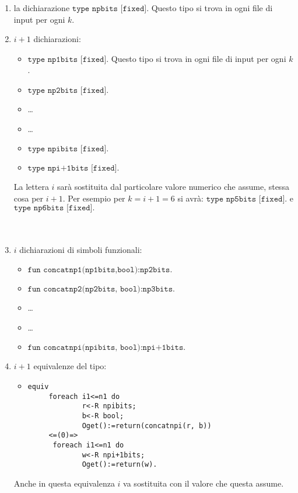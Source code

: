 \documentclass[a4paper,openright,twoside,12pt]{report}
\begin{document}
\begin{enumerate}
 \item la dichiarazione $\texttt{type npbits [fixed].}$ Questo tipo si trova in ogni file di input per ogni $k$.
 \item $i+1$ dichiarazioni: \begin{itemize}
                                       \item $\texttt{type np1bits [fixed].}$ Questo tipo si trova in ogni file di input per ogni $k$.
                                       \item $\texttt{type np2bits [fixed].}$
				       \item \dots
				       \item \dots
				       \item $\texttt{type npibits [fixed].}$
				       \item $\texttt{type npi+1bits [fixed].}$	
	                               \end{itemize}
La lettera $i$ sar\`a sostituita dal particolare valore numerico che assume, stessa cosa per $i+1$.
Per esempio per $k=i+1=6$ si avr\`a: $\texttt{type np5bits [fixed].}$ e $\texttt{type np6bits [fixed].}$
\\
\\
\\
  \item $i$ dichiarazioni di simboli funzionali:\begin{itemize}
                                                          \item $\texttt{fun concatnp1(np1bits,bool):np2bits.}$
							  \item $\texttt{fun concatnp2(np2bits, bool):np3bits.}$
							  \item \dots
							  \item \dots
							  \item $\texttt{fun concatnpi(npibits, bool):npi+1bits.}$    
                                                         \end{itemize}
 
  \item  $i+1$ equivalenze del tipo:
				\begin{itemize}
				 \item \begin{verbatim}
equiv
     foreach i1<=n1 do
             r<-R npibits;
             b<-R bool;
             Oget():=return(concatnpi(r, b))
     <=(0)=>
      foreach i1<=n1 do
             w<-R npi+1bits;
             Oget():=return(w).
				\end{verbatim}
\end{itemize}
Anche in questa equivalenza $i$ va sostituita con il valore che questa assume.


\end{enumerate}
\end{document}
